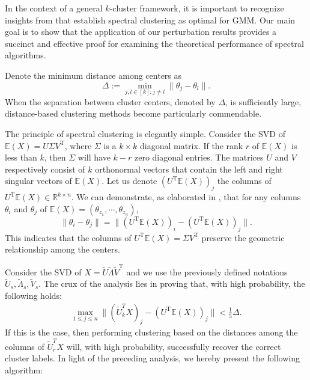 \documentclass[reqno]{amsart}
\newcommand{\E}{\mathbb{E}}
\newcommand{\T}{\mathrm{T}}
\theoremstyle{plain}
\theoremstyle{definition}
\begin{document}
In the context of a general $k$-cluster framework, it is important to recognize insights from \cite{LZZ21} that establish spectral clustering as optimal for GMM. Our main goal is to show that the application of our perturbation results provides a succinct and effective proof for examining the theoretical performance of spectral algorithms.


Denote the minimum distance among centers as
$$\Delta:=\min_{j,l\in [k]: j\neq l} \|\theta_j -\theta_l\|.$$
When the separation between cluster centers, denoted by 
$\Delta$, is sufficiently large, distance-based clustering methods become particularly commendable.  

The principle of spectral clustering is elegantly simple.  Consider the SVD of $\E(X)=U \Sigma V^\T$, where $\Sigma$ is a $k \times k$ diagonal matrix. If the rank $r$ of $\E(X)$ is less than $k$, then $\Sigma$ will have $k-r$ zero diagonal entries. The matrices $U$ and $V$ respectively consist of $k$ orthonormal vectors that contain the left and right singular vectors of $\E(X)$. Let us denote $(U^\T \E (X))_j$ the columns of $U^\T \E (X) \in \mathbb{R}^{k\times n}$. We can demonstrate, as elaborated in  \cite{WangSupp24}, that for any columns $\theta_i$ and $\theta_j$ of $\E(X) = (\theta_{z_1},\cdots,\theta_{z_n})$, 
$$\|\theta_ i - \theta_j \| = \|(U^\T \E (X))_i-(U^\T \E (X))_j\|.$$
This indicates that the columns of $U^\T \E (X) =  \Sigma V^\T$ preserve the geometric relationship among the centers. 

Consider the SVD of $X = \widetilde U \widetilde \Lambda \widetilde V^\T$ and we use the previously defined notations $\widetilde U_{s}, \widetilde \Lambda_{s}, \widetilde V_{s}$. The crux of the analysis lies in proving that, with high probability, the following  holds:
\begin{align}\label{eq:gmmineq}
\max_{1\le j \le n}\|(\widetilde U_{k}^T X)_j - (U^\T \E (X))_j\| < \frac{1}{5} \Delta.
\end{align}
If this is the case, then performing clustering based on the distances among the columns of $\widetilde U_{r}^T X$ will, with high probability, successfully recover the correct cluster labels. In light of the preceding analysis, we hereby present the following algorithm:
\end{document}
